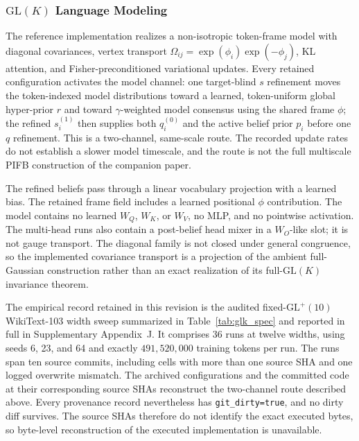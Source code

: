 \documentclass[twoside,11pt]{article}
\begin{document}
\subsubsection{$\mathrm{GL}(K)$ Language Modeling}
\label{sec:experimental_design_glk}

The reference implementation realizes a non-isotropic token-frame model with diagonal covariances, vertex transport $\Omega_{ij}=\exp(\phi_i)\exp(-\phi_j)$, KL attention, and Fisher-preconditioned variational updates. Every retained configuration activates the model channel: one target-blind $s$ refinement moves the token-indexed model distributions toward a learned, token-uniform global hyper-prior $r$ and toward $\gamma$-weighted model consensus using the shared frame $\phi$; the refined $s_i^{(1)}$ then supplies both $q_i^{(0)}$ and the active belief prior $p_i$ before one $q$ refinement. This is a two-channel, same-scale route. The recorded update rates do not establish a slower model timescale, and the route is not the full multiscale PIFB construction of the companion paper.

The refined beliefs pass through a linear vocabulary projection with a learned bias. The retained frame field includes a learned positional $\phi$ contribution. The model contains no learned $W_Q$, $W_K$, or $W_V$, no MLP, and no pointwise activation. The multi-head runs also contain a post-belief head mixer in a $W_O$-like slot; it is not gauge transport. The diagonal family is not closed under general congruence, so the implemented covariance transport is a projection of the ambient full-Gaussian construction rather than an exact realization of its full-$\mathrm{GL}(K)$ invariance theorem.

The empirical record retained in this revision is the audited fixed-$\mathrm{GL}^+(10)$ WikiText-103 width sweep summarized in Table~\ref{tab:glk_spec} and reported in full in Supplementary Appendix~J. It comprises 36 runs at twelve widths, using seeds 6, 23, and 64 and exactly $491{,}520{,}000$ training tokens per run. The runs span ten source commits, including cells with more than one source SHA and one logged overwrite mismatch. The archived configurations and the committed code at their corresponding source SHAs reconstruct the two-channel route described above. Every provenance record nevertheless has \texttt{git\_dirty=true}, and no dirty diff survives. The source SHAs therefore do not identify the exact executed bytes, so byte-level reconstruction of the executed implementation is unavailable.
\end{document}
